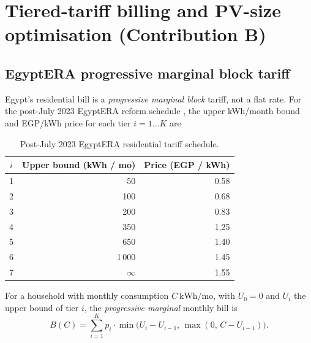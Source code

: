 \section{Tiered-tariff billing and PV-size optimisation (Contribution B)}
\label{sec:tariff}

\subsection{EgyptERA progressive marginal block tariff}
\label{sec:tariff-blocks}

Egypt's residential bill is a \emph{progressive marginal block}
tariff, not a flat rate. For the post-July 2023 EgyptERA reform
schedule \citep{egyptera_tariff}, the upper kWh/month bound and
EGP/kWh price for each tier $i = 1 \dots K$ are

\begin{table}[!htbp]
\centering
\footnotesize
\begin{tabular}{@{}crr@{}}
\toprule
$i$ & \textbf{Upper bound (kWh / mo)} & \textbf{Price (EGP / kWh)} \\
\midrule
1 & 50      & 0.58 \\
2 & 100     & 0.68 \\
3 & 200     & 0.83 \\
4 & 350     & 1.25 \\
5 & 650     & 1.40 \\
6 & 1\,000  & 1.45 \\
7 & $\infty$ & 1.55 \\
\bottomrule
\end{tabular}
\caption{Post-July 2023 EgyptERA residential tariff schedule.}
\label{tab:tariff}
\end{table}

For a household with monthly consumption $C~\mathrm{kWh/mo}$, with
$U_0 = 0$ and $U_i$ the upper bound of tier $i$, the
\emph{progressive marginal} monthly bill is
\begin{equation}
B(C) = \sum_{i=1}^{K} p_i \cdot
       \min\bigl(U_i - U_{i-1},\, \max(0,\, C - U_{i-1})\bigr).
\label{eq:bill}
\end{equation}

